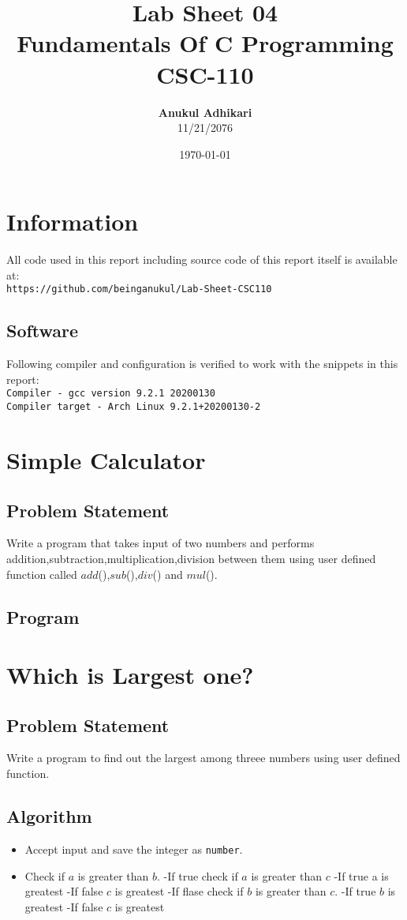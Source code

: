 \documentclass[11pt]{report}
\title{Lab Sheet 04 \\
      \textbf{Fundamentals Of C Programming} \\
      CSC-110}
\author{\textbf{Anukul Adhikari} \\ 11/21/2076}
\date{\today}
\begin{document}
\maketitle

\chapter*{Information}
All code used in this report including source code of this report itself is available at:\\ \texttt{https://github.com/beinganukul/Lab-Sheet-CSC110}
\section*{Software}
Following compiler and configuration is verified to work with the snippets in this report:\\
\texttt{Compiler - gcc version 9.2.1 20200130\\
Compiler target - Arch Linux 9.2.1+20200130-2
}

\tableofcontents

\chapter{Simple Calculator}
\section{Problem Statement}
Write a program that takes input of two numbers and performs addition,subtraction,multiplication,division between them using user defined function called $add$(),$sub$(),$div$() and $mul$().
\section{Program}


\chapter{Which is Largest one?}
\section{Problem Statement}
Write a program to find out the largest among threee numbers using user defined function.
\section{Algorithm}
\begin{itemize}
  \item Accept input and save the integer as \texttt{number}.
  \item Check if $a$ is greater than $b$.
  \subitem -If true check if $a$ is greater than $c$
  \subitem -If true a is greatest 
  \subsubitem -If false $c$ is greatest
  \subitem -If flase check if $b$ is greater than $c$.
  \subitem -If true $b$ is greatest 
  \subsubitem -If false $c$ is greatest
\end{itemize}
\leavevmode
\end{document}

